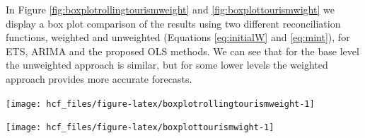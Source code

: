 \documentclass[11pt,a4paper,]{article}
\let\origfigure\figure
\let\endorigfigure\endfigure
\renewenvironment{figure}[1][2] {
    \expandafter\origfigure\expandafter[!htbp]
} {
    \endorigfigure
}
\begin{document}
In Figure \ref{fig:boxplotrollingtourismweight} and
\ref{fig:boxplottourismwight} we display a box plot comparison of the
results using two different reconciliation functions, weighted and
unweighted (Equations \eqref{eq:initialW} and \eqref{eq:mint}), for ETS,
ARIMA and the proposed OLS methods. We can see that for the base level
the unweighted approach is similar, but for some lower levels the
weighted approach provides more accurate forecasts.

\begin{figure}

{\centering \texttt{[image: hcf\_files/figure-latex/boxplotrollingtourismweight-1]} 

}

\caption{Box plots of forecast errors from OLS and WLS reconciled ETS, ARIMA and OLS methods at each hierarchical level for rolling origin 24-step-ahead tourism demand.}\label{fig:boxplotrollingtourismweight}
\end{figure}

\begin{figure}

{\centering \texttt{[image: hcf\_files/figure-latex/boxplottourismwight-1]} 

}

\caption{Box plots of forecast errors from OLS and WLS reconciled ETS, ARIMA and OLS methods at each hierarchical level for fixed origin 24-step-ahead tourism demand.}\label{fig:boxplottourismwight}
\end{figure}

\clearpage

\printbibliography
\end{document}
